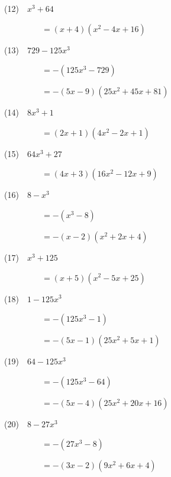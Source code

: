 \documentclass[a4j,twocolumn,10pt,fleqn]{jarticle}
\begin{document}
(12)~~$x^{3} + 64$

~~~~~~~~~$=\left(x + 4\right) \left(x^{2} - 4 x + 16\right)$

(13)~~$729 - 125 x^{3}$

~~~~~~~~~$=-(125 x^{3} - 729)$

~~~~~~~~~$=-\left(5 x - 9\right) \left(25 x^{2} + 45 x + 81\right)$

(14)~~$8 x^{3} + 1$

~~~~~~~~~$=\left(2 x + 1\right) \left(4 x^{2} - 2 x + 1\right)$

(15)~~$64 x^{3} + 27$

~~~~~~~~~$=\left(4 x + 3\right) \left(16 x^{2} - 12 x + 9\right)$

(16)~~$8 - x^{3}$

~~~~~~~~~$=-(x^{3} - 8)$

~~~~~~~~~$=-\left(x - 2\right) \left(x^{2} + 2 x + 4\right)$

(17)~~$x^{3} + 125$

~~~~~~~~~$=\left(x + 5\right) \left(x^{2} - 5 x + 25\right)$

(18)~~$1 - 125 x^{3}$

~~~~~~~~~$=-(125 x^{3} - 1)$

~~~~~~~~~$=-\left(5 x - 1\right) \left(25 x^{2} + 5 x + 1\right)$

(19)~~$64 - 125 x^{3}$

~~~~~~~~~$=-(125 x^{3} - 64)$

~~~~~~~~~$=-\left(5 x - 4\right) \left(25 x^{2} + 20 x + 16\right)$

(20)~~$8 - 27 x^{3}$

~~~~~~~~~$=-(27 x^{3} - 8)$

~~~~~~~~~$=-\left(3 x - 2\right) \left(9 x^{2} + 6 x + 4\right)$
\end{document}
